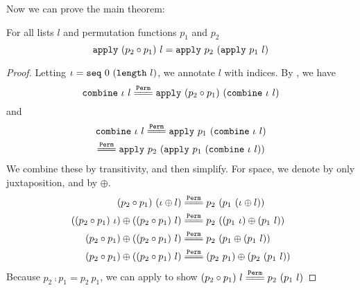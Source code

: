 \documentclass[sigplan,10pt,anonymous,review]{thesis}
\begin{document}
Now we can prove the main theorem:
\begin{theorem}
  For all lists $l$ and permutation functions $p_1$ and $p_2$
  \begin{equation*}
      \texttt{\textup{apply}}~(p_2 \circ p_1)~l = \texttt{\textup{apply}}~p_2~(\texttt{\textup{apply}}~p_1~l)
  \end{equation*}
\end{theorem}
\begin{proof}
  Letting $\iota = \texttt{\textup{seq}}~0~(\texttt{\textup{length}}~l)$, we annotate $l$ with
  indices. By , we have
  \begin{equation*}
     \var{combine}~\iota~l \eqperm \var{apply}~(p_2 \comp p_1)~(\var{combine}~\iota~l)
  \end{equation*}
  and
  \begin{gather*}
    \var{combine}~\iota~l
    \eqperm
    \var{apply}~p_1~(\var{combine}~\iota~l) \\
    \eqperm
    \var{apply}~p_2~(\var{apply}~p_1~(\var{combine}~\iota~l))
  \end{gather*}
  We combine these by transitivity, and then simplify. For space, we
  denote  by only juxtaposition, and  by $\oplus$.
  \begin{align*}
    (p_2 \comp p_1)~(\iota \oplus l)
    &\eqperm
    p_2~(p_1~(\iota \oplus l)) \\
    ((p_2 \comp p_1)~\iota) \oplus ((p_2 \comp p_1)~l)
    &\eqperm
    p_2~((p_1~\iota) \oplus (p_1~l)) \\
    (p_2 \comp p_1) \oplus ((p_2 \comp p_1)~l)
    &\eqperm
    p_2~(p_1 \oplus (p_1~l)) \\
    (p_2 \comp p_1) \oplus ((p_2 \comp p_1)~l)
    &\eqperm
    (p_2~p_1)\oplus(p_2~(p_1~l))
  \end{align*}
  Because $p_2 \comp p_1 = p_2~p_1$, we can apply
   to show $(p_2 \comp p_1)~l \eqperm
  p_2~(p_1~l)$
\end{proof}
\end{document}
